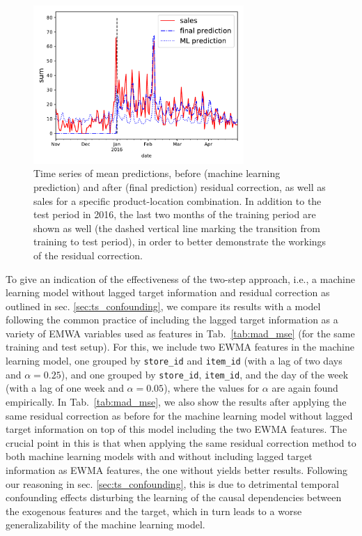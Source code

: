 \documentclass[BCOR=1mm, DIV=calc,10pt,
twoside=true,
twocolumn,
headings=normal]{scrartcl}
\newcommand{\tab}{Tab.~}
\begin{document}
\begin{figure}
\begin{center}
\includegraphics[width=8cm]{figs/ts_item_16_store_2_res}
\caption{\label{fig:ts_res} Time series of mean predictions, before (machine learning prediction) and after (final prediction) residual correction, as well as sales for a specific product-location combination. In addition to the test period in 2016, the last two months of the training period are shown as well (the dashed vertical line marking the transition from training to test period), in order to better demonstrate the workings of the residual correction.}
\end{center}
\end{figure}

\noindent
To give an indication of the effectiveness of the two-step approach, i.e., a machine learning model without lagged target information and residual correction as outlined in sec. \ref{sec:ts_confounding}, we compare its results with a model following the common practice of including the lagged target information as a variety of EMWA variables used as features in \tab \ref{tab:mad_mse} (for the same training and test setup). For this, we include two EWMA features in the machine learning model, one grouped by \texttt{store\_id} and \texttt{item\_id} (with a lag of two days and $\alpha=0.25$), and one grouped by \texttt{store\_id}, \texttt{item\_id}, and the day of the week (with a lag of one week and $\alpha=0.05$), where the values for $\alpha$ are again found empirically. In \tab \ref{tab:mad_mse}, we also show the results after applying the same residual correction as before for the machine learning model without lagged target information on top of this model including the two EWMA features. The crucial point in this is that when applying the same residual correction method to both machine learning models with and without including lagged target information as EWMA features, the one without yields better results. Following our reasoning in sec. \ref{sec:ts_confounding}, this is due to detrimental temporal confounding effects disturbing the learning of the causal dependencies between the exogenous features and the target, which in turn leads to a worse generalizability of the machine learning model.
\end{document}
